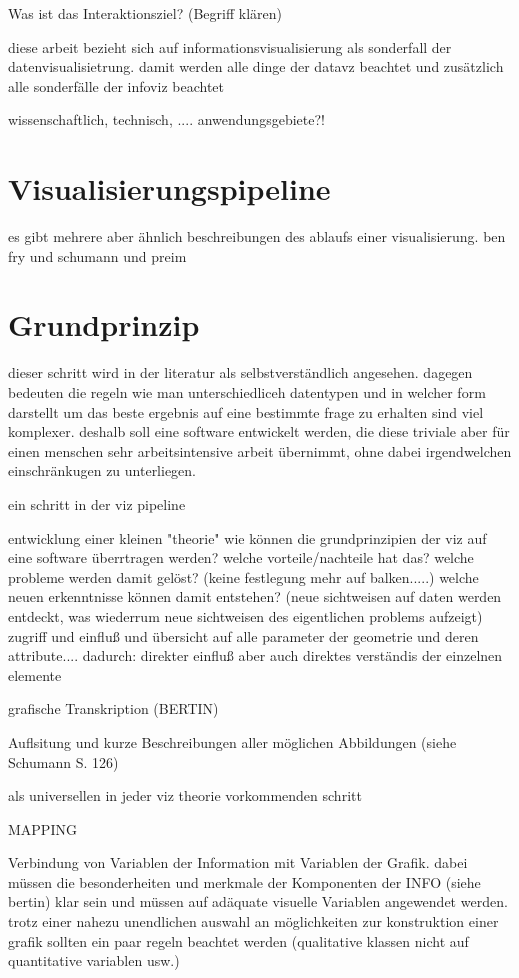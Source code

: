 \documentclass[a4paper, 12pt, DIVcalc, onepage, pdftex, headsepline, footsepline]{scrreprt}
\begin{document}
Was ist das Interaktionsziel? (Begriff klären)

diese arbeit bezieht sich auf informationsvisualisierung als sonderfall der datenvisualisietrung. damit werden alle dinge der datavz beachtet und zusätzlich alle sonderfälle der infoviz beachtet

wissenschaftlich, technisch, .... anwendungsgebiete?!
\section{Visualisierungspipeline}
\label{sec:Pipeline}
es gibt mehrere aber ähnlich beschreibungen des ablaufs einer visualisierung.
ben fry und schumann  und preim
\section{Grundprinzip}
\label{sec:Grundprinzip}
dieser schritt wird in der literatur als selbstverständlich angesehen. dagegen bedeuten die regeln wie man unterschiedliceh datentypen und in welcher form darstellt um das beste ergebnis auf eine bestimmte frage zu erhalten sind viel komplexer.
deshalb soll eine software entwickelt werden, die diese triviale aber für einen menschen sehr arbeitsintensive arbeit übernimmt, ohne dabei irgendwelchen einschränkugen zu unterliegen.

ein schritt in der viz pipeline

entwicklung einer kleinen "theorie"
wie können die grundprinzipien der viz auf eine software überrtragen werden?
welche vorteile/nachteile hat das?
welche probleme werden damit gelöst? (keine festlegung mehr auf balken.....)
welche neuen erkenntnisse können damit entstehen? (neue sichtweisen auf daten werden entdeckt, was wiederrum neue sichtweisen des eigentlichen problems aufzeigt)
zugriff und einfluß und übersicht auf alle parameter der geometrie und deren attribute....
dadurch: direkter einfluß aber auch direktes verständis der einzelnen elemente

grafische Transkription (BERTIN)

Auflsitung und kurze Beschreibungen aller möglichen Abbildungen (siehe Schumann S. 126)

als universellen in jeder viz theorie vorkommenden schritt

MAPPING

Verbindung von Variablen der Information mit Variablen der Grafik.
dabei müssen die besonderheiten und merkmale der Komponenten der INFO (siehe bertin) klar sein und müssen auf adäquate visuelle Variablen angewendet werden.
trotz einer nahezu unendlichen auswahl an möglichkeiten zur konstruktion einer grafik sollten ein paar regeln beachtet werden (qualitative klassen nicht auf quantitative variablen usw.)
\end{document}
